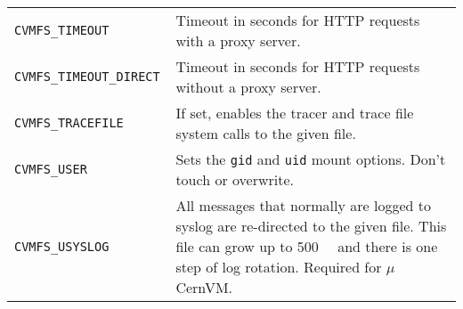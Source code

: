 \begin{longtable}{lX}
		\tt CVMFS\_TIMEOUT 				& Timeout in seconds for HTTP requests with a proxy server.\\
		\tt CVMFS\_TIMEOUT\_DIRECT 		& Timeout in seconds for HTTP requests without a proxy server.\\
		\tt CVMFS\_TRACEFILE				& If set, enables the tracer and trace file system calls to the given file.\\
		\tt CVMFS\_USER						& Sets the \texttt{gid} and \texttt{uid} mount options. Don't touch or overwrite.\\
		\tt CVMFS\_USYSLOG					& All messages that normally are logged to syslog are re-directed to the given file.  This file can grow up to \SI{500}{\kilo\byte} and there is one step of log rotation.  Required for $\mu$CernVM.\\
		\bottomrule
	\end{longtable}
